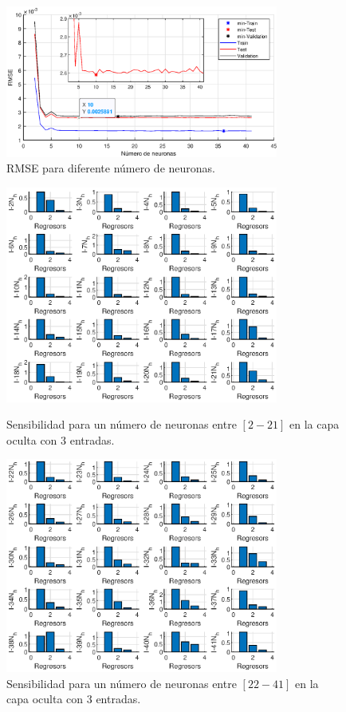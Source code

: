 \documentclass[12pt]{article}
\begin{document}
\begin{itemize}
	\begin{figure}[h!]
		\centering
		\captionsetup{justification=centering}
		\includegraphics[width=0.8\textwidth]{imag/redes/RMSE_full_3.eps}
		\caption{RMSE para diferente número de neuronas.}
		\label{rmse_3}
	\end{figure}
	\newpage
	\clearpage
	\begin{figure}[t!]
		\centering
		\captionsetup{justification=centering}
		\includegraphics[width=0.8\textwidth, height=0.5\textheight]{imag/redes/sensibilidad_full_1_3.eps}
		\caption{Sensibilidad para un número de neuronas entre $[2-21]$ en la capa oculta con 3 entradas.}
		\label{sensi_red_1_3}
		\includegraphics[width=0.8\textwidth, height=0.5\textheight]{imag/redes/sensibilidad_full_2_3.eps}
		\caption{Sensibilidad para un número de neuronas entre $[22-41]$ en la capa oculta con 3 entradas.}
		\label{sensi_red_2_3}
	\end{figure}
\end{itemize} 
\end{document}
